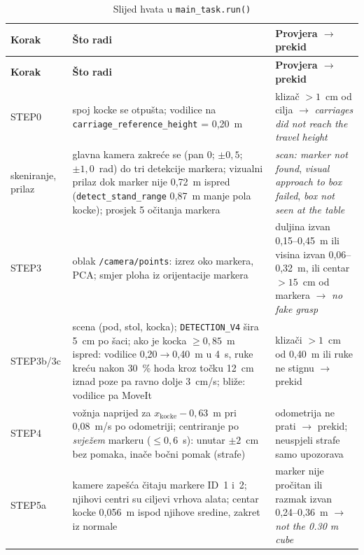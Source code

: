 \begin{small}
\renewcommand{\arraystretch}{1.12}
\begin{longtable}{@{}>{\raggedright\arraybackslash}p{}>{\raggedright\arraybackslash}p{}>{\raggedright\arraybackslash}p{}@{}}
\caption{Slijed hvata u \texttt{main\_task.run()}}\label{tab:07-slijed}\\
\toprule
\textbf{Korak} & \textbf{Što radi} & \textbf{Provjera $\rightarrow$ prekid} \\
\midrule
\endfirsthead
\toprule
\textbf{Korak} & \textbf{Što radi} & \textbf{Provjera $\rightarrow$ prekid} \\
\midrule
\endhead
\footnotesize STEP0 & \footnotesize spoj kocke se otpušta; vodilice na \texttt{carriage\_reference\_height} = 0{,}20~m & \footnotesize klizač $>1$~cm od cilja $\rightarrow$ \emph{carriages did not reach the travel height} \\
\footnotesize skeniranje, prilaz & \footnotesize glavna kamera zakreće se (pan 0; $\pm0{,}5$; $\pm1{,}0$~rad) do tri detekcije markera; vizualni prilaz dok marker nije 0{,}72~m ispred (\texttt{detect\_stand\_range} 0{,}87~m manje pola kocke); prosjek 5 očitanja markera & \footnotesize \emph{scan: marker not found}, \emph{visual approach to box failed}, \emph{box not seen at the table} \\
\footnotesize STEP3 & \footnotesize oblak \texttt{/camera/points}: izrez oko markera, PCA; smjer ploha iz orijentacije markera & \footnotesize duljina izvan 0{,}15--0{,}45~m ili visina izvan 0{,}06--0{,}32~m, ili centar $>15$~cm od markera $\rightarrow$ \emph{no fake grasp} \\
\footnotesize STEP3b/3c & \footnotesize scena (pod, stol, kocka); \texttt{DETECTION\_V4} šira 5~cm po šaci; ako je kocka $\geq0{,}85$~m ispred: vodilice 0{,}20$\rightarrow$0{,}40~m u 4~s, ruke kreću nakon 30~\% hoda kroz točku 12~cm iznad poze pa ravno dolje 3~cm/s; bliže: vodilice pa MoveIt & \footnotesize klizači $>1$~cm od 0{,}40~m ili ruke ne stignu $\rightarrow$ prekid \\
\footnotesize STEP4 & \footnotesize vožnja naprijed za $x_\mathrm{kocke}-0{,}63$~m pri 0{,}08~m/s po odometriji; centriranje po \emph{svježem} markeru ($\leq0{,}6$~s): unutar $\pm2$~cm bez pomaka, inače bočni pomak (strafe) & \footnotesize odometrija ne prati $\rightarrow$ prekid; neuspjeli strafe samo upozorava \\
\footnotesize STEP5a & \footnotesize kamere zapešća čitaju markere ID~1 i~2; njihovi centri su ciljevi vrhova alata; centar kocke 0{,}056~m ispod njihove sredine, zakret iz normale & \footnotesize marker nije pročitan ili razmak izvan 0{,}24--0{,}36~m $\rightarrow$ \emph{not the 0.30 m cube} \\

\end{longtable}
\end{small}
